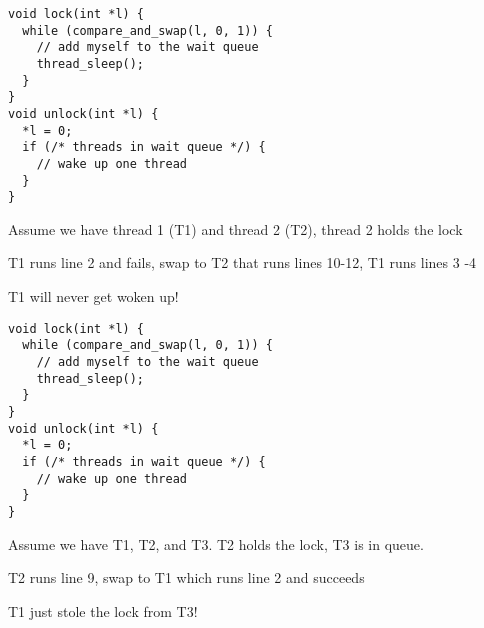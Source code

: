   \begin{slide}


    \begin{verbatim}
void lock(int *l) {
  while (compare_and_swap(l, 0, 1)) {
    // add myself to the wait queue
    thread_sleep();
  }
}
void unlock(int *l) {
  *l = 0;
  if (/* threads in wait queue */) {
    // wake up one thread
  }
}
    \end{verbatim}
    \medskip

    Assume we have thread 1 (T1) and thread 2 (T2), thread 2 holds the lock

    \leftspace{}T1 runs line 2 and fails, swap to T2 that runs lines 10-12, T1
    runs lines 3 -4

    \leftspace{}\leftspace{}T1 will never get woken up!
  \end{slide}

  \begin{slide}


    \begin{verbatim}
void lock(int *l) {
  while (compare_and_swap(l, 0, 1)) {
    // add myself to the wait queue
    thread_sleep();
  }
}
void unlock(int *l) {
  *l = 0;
  if (/* threads in wait queue */) {
    // wake up one thread
  }
}
    \end{verbatim}
    \medskip

    Assume we have T1, T2, and T3. T2 holds the lock, T3 is in queue.

    \leftspace{}T2 runs line 9, swap to T1 which runs line 2 and succeeds

    \leftspace{}\leftspace{}T1 just stole the lock from T3!
  \end{slide}

